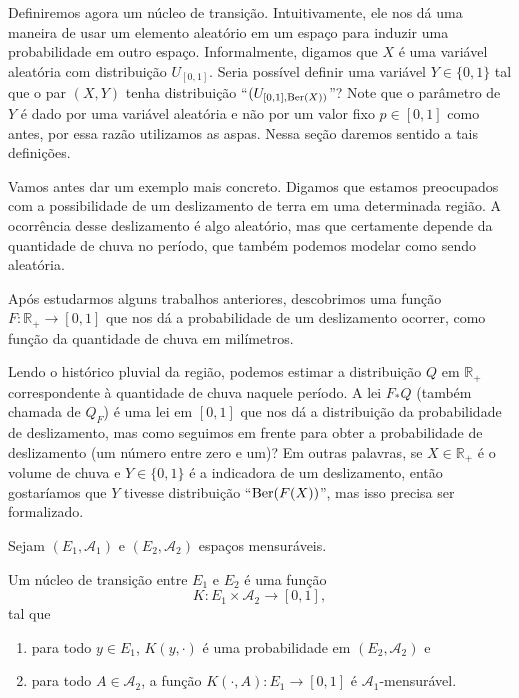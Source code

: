 Definiremos agora um núcleo de transição.
Intuitivamente, ele nos dá uma maneira de usar um elemento aleatório em um espaço para induzir uma probabilidade em outro espaço.
Informalmente, digamos que $X$ é uma variável aleatória com distribuição $U_{[0, 1]}$.
Seria possível definir uma variável $Y \in \{0, 1\}$ tal que o par $(X, Y)$ tenha distribuição ``$(U_{[0, 1], \operatorname{Ber}(X))}$''?
Note que o parâmetro de $Y$ é dado por uma variável aleatória e não por um valor fixo $p \in [0, 1]$ como antes, por essa razão utilizamos as aspas.
Nessa seção daremos sentido a tais definições.

Vamos antes dar um exemplo mais concreto.
Digamos que estamos preocupados com a possibilidade de um deslizamento de terra em uma determinada região.
A ocorrência desse deslizamento é algo aleatório, mas que certamente depende da quantidade de chuva no período, que também podemos modelar como sendo aleatória.

Após estudarmos alguns trabalhos anteriores, descobrimos uma função $F:\mathbb{R}_+ \to [0,1]$ que nos dá a probabilidade de um deslizamento ocorrer, como função da quantidade de chuva em milímetros.

Lendo o histórico pluvial da região, podemos estimar a distribuição $Q$ em $\mathbb{R}_+$ correspondente à quantidade de chuva naquele período.
A lei $F_* Q$ (também chamada de $Q_F$) é uma lei em $[0,1]$ que nos dá a distribuição da probabilidade de deslizamento, mas como seguimos em frente para obter a probabilidade de deslizamento (um número entre zero e um)?
Em outras palavras, se $X \in \mathbb{R}_+$ é o volume de chuva e $Y \in \{0, 1\}$ é a indicadora de um deslizamento, então gostaríamos que $Y$ tivesse distribuição ``$\operatorname{Ber}(F(X))$'', mas isso precisa ser formalizado.

Sejam $(E_1, \mathcal{A}_1)$ e $(E_2, \mathcal{A}_2)$ espaços mensuráveis.
\begin{definition}
  Um núcleo de transição entre $E_1$ e $E_2$ é uma função 
  \begin{equation}
    K: E_1 \times \mathcal{A}_2 \to [0,1],
  \end{equation}
  tal que
  \begin{enumerate}[\quad a)]
  \item para todo $y \in E_1$, $K(y,\cdot)$ é uma probabilidade em $(E_2, \mathcal{A}_2)$ e
  \item para todo $A \in \mathcal{A}_2$, a função $K(\cdot, A): E_1 \to [0,1]$ é $\mathcal{A}_1$-mensurável.
  \end{enumerate}
\end{definition}

